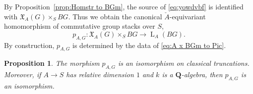 \documentclass[12pt, oneside]{amsart}
\numberwithin{equation}{section}
\newtheorem{proposition}[subsubsection]{Proposition}
\theoremstyle{remark}
\theoremstyle{plain}
\newcommand{\frX}{\mathfrak{X}}
\newcommand{\Loop}{\operatorname{L}}
\newcommand{\bQ}{\mathbf{Q}}
\begin{document}
By Proposition~\ref{prop:Homstr to BGm}, the source of \eqref{eq:yowdvbf} is identified with $\frX_A(G) \times_S BG$.
Thus we obtain the canonical $\check{A}$-equivariant homomorphism of commutative group stacks over $S$,
\begin{equation}\label{eq:pAG}
	p_{A,G} : \frX_A(G) \times_S BG \to
	\Loop_A(BG).
\end{equation}
By construction, $p_{A,G}$ is determined by the data of \eqref{eq:A x BGm to Pic}.

\begin{proposition}\label{prop:pAG isomorphism}
The morphism $p_{A,G}$ is an isomorphism on classical truncations.
Moreover, if $A\to S$ has relative dimension $1$ and $k$ is a $\bQ$-algebra, then $p_{A,G}$ is an isomorphism.
\end{proposition}
\end{document}
